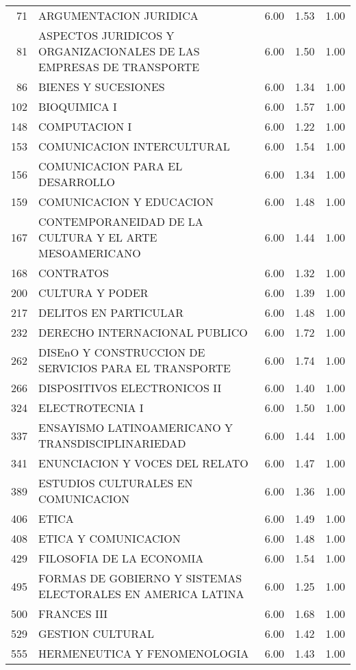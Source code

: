\documentclass[12pt]{article}
\begin{document}
\begin{table}[ht]
\begin{tabular}{rlrrr}
  71 & ARGUMENTACION JURIDICA & 6.00 & 1.53 & 1.00 \\ 
  81 & ASPECTOS JURIDICOS Y ORGANIZACIONALES DE LAS EMPRESAS DE TRANSPORTE & 6.00 & 1.50 & 1.00 \\ 
  86 & BIENES Y SUCESIONES & 6.00 & 1.34 & 1.00 \\ 
  102 & BIOQUIMICA I & 6.00 & 1.57 & 1.00 \\ 
  148 & COMPUTACION I & 6.00 & 1.22 & 1.00 \\ 
  153 & COMUNICACION INTERCULTURAL & 6.00 & 1.54 & 1.00 \\ 
  156 & COMUNICACION PARA EL DESARROLLO & 6.00 & 1.34 & 1.00 \\ 
  159 & COMUNICACION Y EDUCACION & 6.00 & 1.48 & 1.00 \\ 
  167 & CONTEMPORANEIDAD DE LA CULTURA Y EL ARTE MESOAMERICANO & 6.00 & 1.44 & 1.00 \\ 
  168 & CONTRATOS & 6.00 & 1.32 & 1.00 \\ 
  200 & CULTURA Y PODER & 6.00 & 1.39 & 1.00 \\ 
  217 & DELITOS EN PARTICULAR & 6.00 & 1.48 & 1.00 \\ 
  232 & DERECHO INTERNACIONAL PUBLICO & 6.00 & 1.72 & 1.00 \\ 
  262 & DISEnO Y CONSTRUCCION DE SERVICIOS PARA EL TRANSPORTE & 6.00 & 1.74 & 1.00 \\ 
  266 & DISPOSITIVOS ELECTRONICOS II & 6.00 & 1.40 & 1.00 \\ 
  324 & ELECTROTECNIA I & 6.00 & 1.50 & 1.00 \\ 
  337 & ENSAYISMO LATINOAMERICANO Y TRANSDISCIPLINARIEDAD & 6.00 & 1.44 & 1.00 \\ 
  341 & ENUNCIACION Y VOCES DEL RELATO & 6.00 & 1.47 & 1.00 \\ 
  389 & ESTUDIOS CULTURALES EN COMUNICACION & 6.00 & 1.36 & 1.00 \\ 
  406 & ETICA & 6.00 & 1.49 & 1.00 \\ 
  408 & ETICA Y COMUNICACION & 6.00 & 1.48 & 1.00 \\ 
  429 & FILOSOFIA DE LA ECONOMIA & 6.00 & 1.54 & 1.00 \\ 
  495 & FORMAS DE GOBIERNO Y SISTEMAS ELECTORALES EN AMERICA LATINA & 6.00 & 1.25 & 1.00 \\ 
  500 & FRANCES III & 6.00 & 1.68 & 1.00 \\ 
  529 & GESTION CULTURAL & 6.00 & 1.42 & 1.00 \\ 
  555 & HERMENEUTICA Y FENOMENOLOGIA & 6.00 & 1.43 & 1.00 \\ 

\end{tabular}
\end{table}
\end{document}
